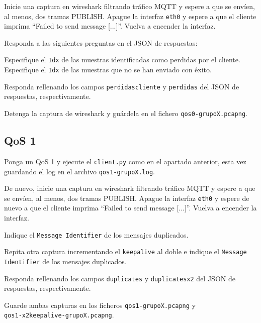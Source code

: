 \documentclass{upmassignment}
\begin{document}
Inicie una
captura en wireshark filtrando
tráfico MQTT y espere a que
se envíen, al menos, dos tramas
PUBLISH. Apague la interfaz
\texttt{eth0} y espere a que
el cliente imprima
``Failed to send message [...]''.
Vuelva a encender la interfaz.


Responda a las siguientes preguntas
en el JSON de respuestas:
\begin{problemlist}
    \pbitem Especifique el \verb|Idx|
        de las muestras identificadas
        como perdidas por el cliente.
    \pbitem Especifique el \verb|Idx|
        de las muestras que no se
        han enviado con éxito.
\end{problemlist}
Responda rellenando los campos
\texttt{perdidascliente} y
\texttt{perdidas} del JSON
de respuestas, respectivamente.

Detenga la captura de wireshark y
guárdela en el fichero
\texttt{qos0-grupoX.pcapng}.


\subsection*{QoS 1}
\noindent
Ponga un QoS 1 y ejecute el \texttt{client.py}
como en el apartado anterior, esta vez
guardando el log en el archivo
\texttt{qos1-grupoX.log}.

De nuevo, inicie una captura en wireshark
filtrando tráfico MQTT y espere a que
se envíen, al menos, dos tramas PUBLISH.
Apague la interfaz \texttt{eth0}
y espere de nuevo a que el cliente
imprima ``Failed to send message [...]''.
Vuelva a encender la interfaz.





\begin{problemlist}
    \setcounter{enumi}{6}
    \pbitem Indique el
        \texttt{Message Identifier}
        de los mensajes duplicados.


    \pbitem Repita otra captura
        incrementando el \texttt{keepalive}
        al doble e indique el
        \texttt{Message Identifier}
        de los mensajes duplicados.

\end{problemlist}
Responda rellenando los campos
\texttt{duplicates} y
\texttt{duplicatesx2} del JSON
de respuestas, respectivamente.

Guarde ambas capturas
en los ficheros
\texttt{qos1-grupoX.pcapng} y\\
\texttt{qos1-x2keepalive-grupoX.pcapng}.
\end{document}

